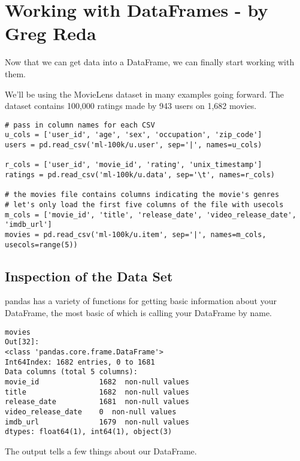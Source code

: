 \documentclass[]{article}
\title{}
\author{}
\begin{document}
\section{Working with DataFrames - by Greg Reda}

 
\item Now that we can get data into a DataFrame, we can finally start working with them.
\item 
We'll be using the MovieLens dataset in many examples going forward. The dataset contains 100,000 ratings made by 943 users on 1,682 movies.

 
\begin{framed}
\begin{verbatim}
# pass in column names for each CSV
u_cols = ['user_id', 'age', 'sex', 'occupation', 'zip_code']
users = pd.read_csv('ml-100k/u.user', sep='|', names=u_cols)

r_cols = ['user_id', 'movie_id', 'rating', 'unix_timestamp']
ratings = pd.read_csv('ml-100k/u.data', sep='\t', names=r_cols)

# the movies file contains columns indicating the movie's genres
# let's only load the first five columns of the file with usecols
m_cols = ['movie_id', 'title', 'release_date', 'video_release_date', 'imdb_url']
movies = pd.read_csv('ml-100k/u.item', sep='|', names=m_cols, 
usecols=range(5))
\end{verbatim}
\end{framed}
\subsection{Inspection of the Data Set}

pandas has a variety of functions for getting basic information about your DataFrame, the most basic of which is calling your DataFrame by name.
\begin{verbatim}
movies
Out[32]:
<class 'pandas.core.frame.DataFrame'>
Int64Index: 1682 entries, 0 to 1681
Data columns (total 5 columns):
movie_id              1682  non-null values
title                 1682  non-null values
release_date          1681  non-null values
video_release_date    0  non-null values
imdb_url              1679  non-null values
dtypes: float64(1), int64(1), object(3)
\end{verbatim}
The output tells a few things about our DataFrame.
\end{document}
